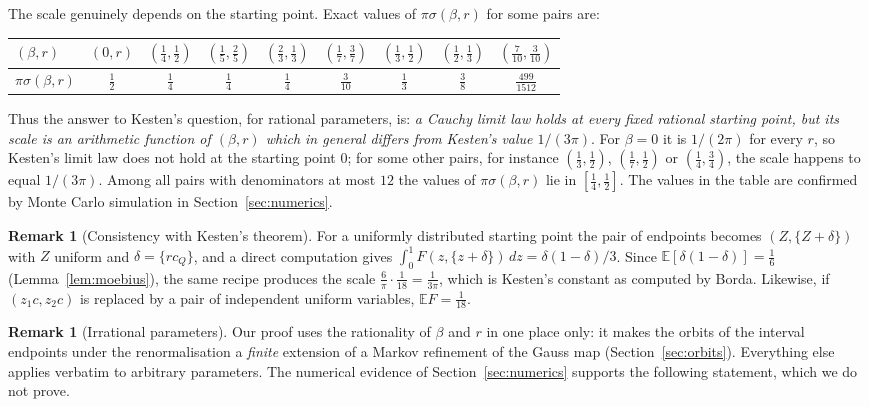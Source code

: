 \documentclass[11pt]{amsart}
\theoremstyle{definition}
\newtheorem{remark}[theorem]{Remark}
\numberwithin{equation}{section}
\newcommand{\E}{\mathbb{E}}
\newcommand{\fr}[1]{\{#1\}}
\begin{document}
The scale genuinely depends on the starting point. Exact values of $\pi\sigma(\beta,r)$ for some pairs are:
\begin{center}\small
\begin{tabular}{lcccccccc}\toprule
$(\beta,r)$ & $(0,r)$ & $(\frac14,\frac12)$ & $(\frac15,\frac25)$ & $(\frac23,\frac13)$ & $(\frac17,\frac37)$ & $(\frac13,\frac12)$ & $(\frac12,\frac13)$ & $(\frac7{10},\frac3{10})$\\\midrule
$\pi\sigma(\beta,r)$ & $\frac12$ & $\frac14$ & $\frac14$ & $\frac14$ & $\frac3{10}$ & $\frac13$ & $\frac38$ & $\frac{499}{1512}$\\\bottomrule
\end{tabular}
\end{center}
Thus the answer to Kesten's question, for rational parameters, is: \emph{a Cauchy limit law holds at every fixed rational starting point, but
its scale is an arithmetic function of $(\beta,r)$ which in general differs from Kesten's value $1/(3\pi)$}. For $\beta=0$ it is $1/(2\pi)$ for every
$r$, so Kesten's limit law does not hold at the starting point $0$; for some other pairs, for instance $(\frac13,\frac12)$, $(\frac17,\frac12)$ or
$(\frac14,\frac34)$, the scale happens to equal $1/(3\pi)$. Among all pairs with denominators at most $12$ the values of $\pi\sigma(\beta,r)$ lie in
$[\frac14,\frac12]$. The values in the table are confirmed by Monte Carlo simulation in Section~\ref{sec:numerics}.

\begin{remark}[Consistency with Kesten's theorem]\label{rem:kesten}
For a uniformly distributed starting point the pair of endpoints becomes $(Z,\fr{Z+\delta})$ with $Z$ uniform and $\delta=\fr{rc_Q}$, and a
direct computation gives $\int_0^1F(z,\fr{z+\delta})\,dz=\delta(1-\delta)/3$. Since $\E[\delta(1-\delta)]=\frac16$ (Lemma~\ref{lem:moebius}),
the same recipe produces the scale $\frac6\pi\cdot\frac1{18}=\frac1{3\pi}$, which is Kesten's constant as computed by Borda. Likewise, if
$(z_1c,z_2c)$ is replaced by a pair of independent uniform variables, $\E F=\frac1{18}$.
\end{remark}

\begin{remark}[Irrational parameters]\label{rem:irr}
Our proof uses the rationality of $\beta$ and $r$ in one place only: it makes the orbits of the interval endpoints under the renormalisation
a \emph{finite} extension of a Markov refinement of the Gauss map (Section~\ref{sec:orbits}). Everything else applies verbatim to arbitrary
parameters. The numerical evidence of Section~\ref{sec:numerics} supports the following statement, which we do not prove.
\end{remark}
\end{document}
